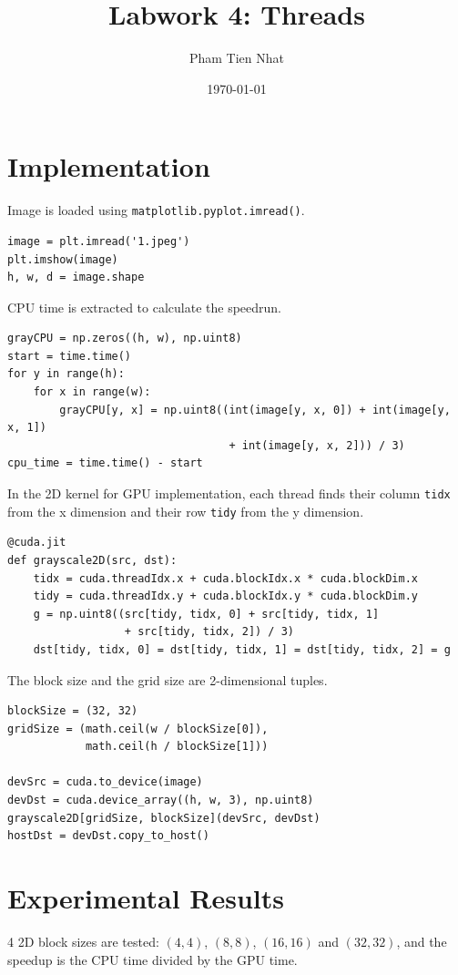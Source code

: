 \documentclass{article}
\title{Labwork 4: Threads}
\author{Pham Tien Nhat}
\date{\today}
\begin{document}
\maketitle

\section{Implementation}


Image is loaded using \texttt{matplotlib.pyplot.imread()}. 

\begin{Verbatim}
image = plt.imread('1.jpeg')
plt.imshow(image)
h, w, d = image.shape
\end{Verbatim}

CPU time is extracted to calculate the speedrun. 

\begin{Verbatim}
grayCPU = np.zeros((h, w), np.uint8)
start = time.time()
for y in range(h):
    for x in range(w):
        grayCPU[y, x] = np.uint8((int(image[y, x, 0]) + int(image[y, x, 1])
                                  + int(image[y, x, 2])) / 3)
cpu_time = time.time() - start
\end{Verbatim}

In the 2D kernel for GPU implementation, each thread finds their column \texttt{tidx} from the x dimension and their row \texttt{tidy} from the y dimension. 

\begin{Verbatim}
@cuda.jit
def grayscale2D(src, dst):
    tidx = cuda.threadIdx.x + cuda.blockIdx.x * cuda.blockDim.x
    tidy = cuda.threadIdx.y + cuda.blockIdx.y * cuda.blockDim.y
    g = np.uint8((src[tidy, tidx, 0] + src[tidy, tidx, 1]
                  + src[tidy, tidx, 2]) / 3)
    dst[tidy, tidx, 0] = dst[tidy, tidx, 1] = dst[tidy, tidx, 2] = g
\end{Verbatim}

The block size and the grid size are 2-dimensional tuples. 

\begin{Verbatim}
blockSize = (32, 32)
gridSize = (math.ceil(w / blockSize[0]),
            math.ceil(h / blockSize[1]))

devSrc = cuda.to_device(image)
devDst = cuda.device_array((h, w, 3), np.uint8)
grayscale2D[gridSize, blockSize](devSrc, devDst)
hostDst = devDst.copy_to_host()
\end{Verbatim}

\section{Experimental Results}
4 2D block sizes are tested: $(4, 4)$, $(8, 8)$, $(16, 16)$ and $(32, 32)$, and the speedup is the CPU time divided by the GPU time.
\end{document}
